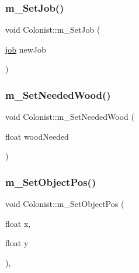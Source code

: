 \mbox{\label{class_colonist_aa95eaa2ece608aceff02abbd69303721}} 
\subsubsection{\texorpdfstring{m\+\_\+\+Set\+Job()}{m\_SetJob()}}
{\footnotesize\ttfamily void Colonist\+::m\+\_\+\+Set\+Job (\begin{DoxyParamCaption}\item[{\mbox{\hyperlink{_colonist_8h_a7718e37d567b721003cf67cbd3125b4a}{job}}}]{new\+Job }\end{DoxyParamCaption})}

\mbox{\label{class_colonist_acc420a406fbf716b24447baaeadb9136}} 
\subsubsection{\texorpdfstring{m\+\_\+\+Set\+Needed\+Wood()}{m\_SetNeededWood()}}
{\footnotesize\ttfamily void Colonist\+::m\+\_\+\+Set\+Needed\+Wood (\begin{DoxyParamCaption}\item[{float}]{wood\+Needed }\end{DoxyParamCaption})}

\mbox{\label{class_colonist_a4dd53225a89bab611509a4d8fc0c2fb1}} 
\subsubsection{\texorpdfstring{m\+\_\+\+Set\+Object\+Pos()}{m\_SetObjectPos()}}
{\footnotesize\ttfamily void Colonist\+::m\+\_\+\+Set\+Object\+Pos (\begin{DoxyParamCaption}\item[{float}]{x,  }\item[{float}]{y }\end{DoxyParamCaption})\hspace{0.3cm}{\ttfamily [override]}, {\ttfamily [virtual]}}



